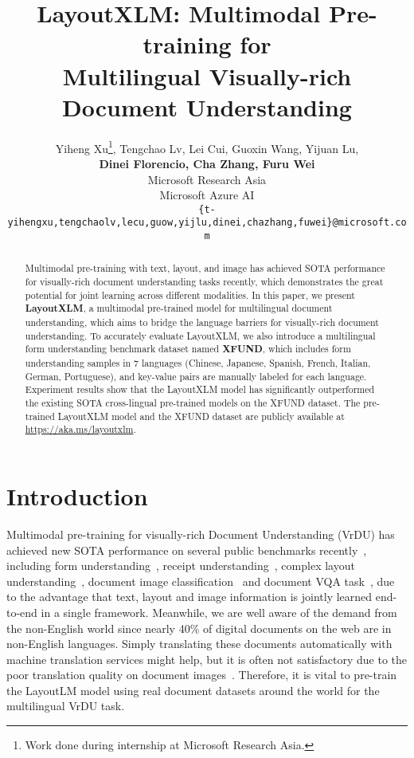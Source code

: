\documentclass[11pt]{article}
\title{LayoutXLM: Multimodal Pre-training for \\Multilingual Visually-rich Document Understanding}
\author{Yiheng Xu\thanks{Work done during internship at Microsoft Research Asia.}, Tengchao Lv,  Lei Cui, Guoxin Wang, Yijuan Lu, \\ \textbf{Dinei Florencio, Cha Zhang, Furu Wei} \\
Microsoft Research Asia\\
Microsoft Azure AI\\
\texttt{\{t-yihengxu,tengchaolv,lecu,guow,yijlu,dinei,chazhang,fuwei\}@microsoft.com} \\
}
\newcommand{\task}{\textsc{XFUND}\xspace}
\begin{document}
\maketitle
\begin{abstract}


	Multimodal pre-training with text, layout, and image has achieved SOTA performance for visually-rich document understanding tasks recently, which demonstrates the great potential for joint learning across different modalities. In this paper, we present \textbf{LayoutXLM}, a multimodal pre-trained model for multilingual document understanding, which aims to bridge the language barriers for visually-rich document understanding. To accurately evaluate LayoutXLM, we also introduce a multilingual form understanding benchmark dataset named \textbf{\task}, which includes form understanding samples in 7 languages (Chinese, Japanese, Spanish, French, Italian, German, Portuguese), and key-value pairs are manually labeled for each language. Experiment results show that the LayoutXLM model has significantly outperformed the existing SOTA cross-lingual pre-trained models on the \task dataset. The pre-trained LayoutXLM model and the \task dataset are publicly available at \url{https://aka.ms/layoutxlm}.

\end{abstract}

\section{Introduction}


Multimodal pre-training for visually-rich Document Understanding (VrDU) has achieved new SOTA performance on several public benchmarks recently~\citep{xu2020layoutlmv2,10.1145/3394486.3403172}, including form understanding~\citep{Jaume_2019}, receipt understanding~\citep{park2019cord}, complex layout understanding~\citep{graliski2020kleister}, document image classification~\citep{harley2015icdar} and document VQA task~\cite{mathew2020docvqa}, due to the advantage that text, layout and image information is jointly learned end-to-end in a single framework. Meanwhile, we are well aware of the demand from the non-English world since nearly 40\% of digital documents on the web are in non-English languages. Simply translating these documents automatically with machine translation services might help, but it is often not satisfactory due to the poor translation quality on document images~\citep{afli-way-2016-integrating}. Therefore, it is vital to pre-train the LayoutLM model using real document datasets around the world for the multilingual VrDU task.
\end{document}
